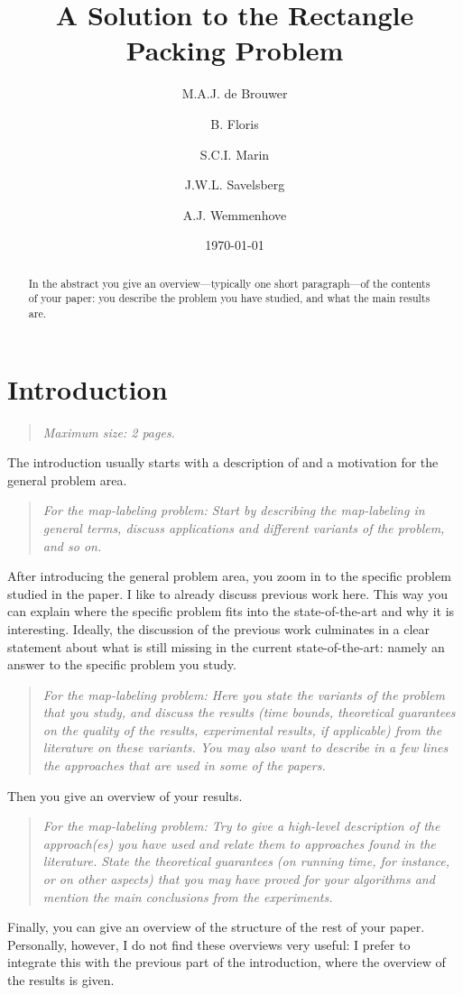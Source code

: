 \documentclass[11pt]{article}
\title{A Solution to the Rectangle Packing Problem}
\author{M.A.J. de Brouwer \and B. Floris \and S.C.I. Marin \and J.W.L. Savelsberg \and A.J. Wemmenhove}
\date{\today}
\newcommand{\maxsize}[1]{\begin{quotation} {\sl \noindent Maximum size: #1.} \end{quotation}}
\newcommand{\ml}[1]{\begin{quotation} {\sl \noindent For the map-labeling problem: #1} \end{quotation}}
\begin{document}
\maketitle

\begin{abstract}
In the abstract you give an overview---typically one short paragraph---of the contents of
your paper: you describe the problem you have studied, and what the main results are.
\end{abstract}

\section{Introduction}
\label{se:introduction}
\maxsize{2 pages}
The introduction usually starts with a description of and
a motivation for the general problem area.

\ml{Start by describing the map-labeling in general terms, discuss applications and
	different variants of the problem, and so on.}

	After introducing the general problem area, you zoom in to the specific problem
	studied in the paper. I like to already discuss previous work here. This way
	you can explain where the specific problem fits into the state-of-the-art
	and why it is interesting. Ideally, the discussion of the previous work
	culminates in a clear statement about what is still missing in the current
	state-of-the-art: namely an answer to the specific problem you study.
	\ml{Here you state the variants of the problem that you study, and discuss the results
		(time bounds, theoretical guarantees on the quality of the results, experimental results,
		 if applicable) from the literature on these variants. You may also want to describe
			in a few lines the approaches that are used in some of the papers.}
			Then you give an overview of your results.
			\ml{Try to give a high-level description of the
				approach(es) you have used and relate them to approaches found in the literature.
					State the theoretical guarantees (on running time,
							for instance, or on other aspects) that you may have proved for your algorithms
					and mention the main conclusions from the experiments.}
					Finally, you can give an overview of the structure of the rest of your paper.
					Personally, however, I do not find these overviews very useful: I prefer to
					integrate this with the previous part of the introduction, where the overview
					of the results is given.
					\medskip
\end{document}
